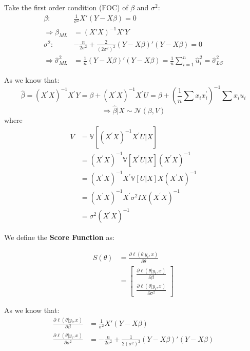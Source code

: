 Take the first order condition (FOC) of $\beta$ and $\sigma^2$:
\begin{align*}
    \beta: &\frac{1}{\sigma^2}X'(Y - X\beta ) = 0\\
    \Rightarrow\hat{\beta}_{ML} &= (X'X)^{-1}X'Y\\
    \sigma^2:& -\frac{n}{2\sigma^2} + \frac{2}{(2\sigma^2)^2} (Y - X\beta)'(Y - X\beta) = 0\\
    \Rightarrow \hat{\sigma}^2_{ML} &= \frac{1}{n} (Y - X\beta)'(Y - X\beta) = \frac{1}{n} \sum_{i=1}^{n} \hat{u}^2_i = \hat{\sigma}^2_{LS}
\end{align*}

As we know that:
\[\hat{\beta } = (X^{\prime} X)^{-1}X^{\prime} Y = \beta +(X^{\prime} X)^{-1}X^{\prime} U = \beta + \left(\frac{1}{n}\sum x_i x^{\prime} _i \right)^{-1}\sum x_i u_i\]
\[\Rightarrow \hat{\beta }|X \sim \mathcal{N} (\beta , V)\]
where
\begin{align*}
    V &= \mathbb{V}\left[(X^{\prime} X)^{-1}X^{\prime} U |X\right]\\
    &= (X^{\prime} X)^{-1}\mathbb{V}[X^{\prime} U|X](X^{\prime} X)^{-1}\\
    &= (X^{\prime} X)^{-1}X^{\prime} \mathbb{V}[U|X] X(X^{\prime} X)^{-1}\\
    &= (X^{\prime} X)^{-1}X^{\prime} \sigma^2 I X(X^{\prime} X)^{-1}\\
    &= \sigma^2 (X^{\prime} X)^{-1}
\end{align*}

We define the \textbf{Score Function} as:
\begin{definition}
    \begin{align*}
        S(\theta ) &= \frac{\partial \ell(\theta |y_i, x)}{\partial \theta }\\
        &= \begin{bmatrix}
            \frac{\partial \ell(\theta |y_i, x)}{\partial \beta }\\
            \frac{\partial \ell(\theta |y_i, x)}{\partial \sigma^2}
        \end{bmatrix}
    \end{align*}
\end{definition}


As we know that:
\begin{align*}
    \frac{\partial \ell(\theta |y_i, x)}{\partial \beta } &= \frac{1}{\sigma^2}X'(Y - X\beta )\\
    \frac{\partial \ell(\theta |y_i, x)}{\partial \sigma^2} &= -\frac{n}{2\sigma^2} + \frac{1}{2(\sigma^2)^2} (Y - X\beta )'(Y - X\beta )
\end{align*}

